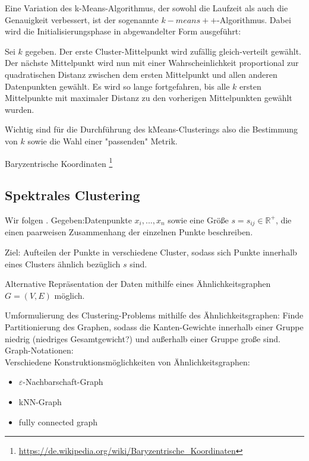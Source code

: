 \documentclass[11pt,a4paper]{article}
\numberwithin{equation}{section}
\begin{document}
	Eine Variation des k-Means-Algorithmus, der sowohl die Laufzeit als auch die Genauigkeit verbessert, ist der sogenannte $k-means++$-Algorithmus. Dabei wird die Initialisierungsphase in abgewandelter Form ausgeführt:
	
	Sei $k$ gegeben. Der erste Cluster-Mittelpunkt wird zufällig gleich-verteilt gewählt. Der nächste Mittelpunkt wird nun mit einer Wahrscheinlichkeit proportional zur quadratischen Distanz zwischen dem ersten Mittelpunkt und allen anderen Datenpunkten gewählt. Es wird so lange fortgefahren, bis alle $k$ ersten Mittelpunkte mit maximaler Distanz zu den vorherigen Mittelpunkten gewählt wurden.
	
	
	Wichtig sind für die Durchführung des kMeans-Clusterings also die Bestimmung von $k$ sowie die Wahl einer "passenden" Metrik.



	Baryzentrische Koordinaten \footnote{\url{https://de.wikipedia.org/wiki/Baryzentrische_Koordinaten}}
	
	\subsection{Spektrales Clustering}
	Wir folgen \cite{spectralClustering_tut}.
	Gegeben:Datenpunkte $x_i, ..., x_n$ sowie eine Größe $s = s_{ij} \in \mathbb{R}^{+}$, die einen paarweisen Zusammenhang der einzelnen Punkte beschreiben.
	
	Ziel: Aufteilen der Punkte in verschiedene Cluster, sodass sich Punkte innerhalb eines Clusters ähnlich bezüglich $s$ sind.
	
	Alternative Repräsentation der Daten mithilfe eines Ähnlichkeitsgraphen $G=(V,E)$ möglich.
	
	Umformulierung des Clustering-Problems mithilfe des Ähnlichkeitsgraphen: Finde Partitionierung des Graphen, sodass die Kanten-Gewichte innerhalb einer Gruppe niedrig (niedriges Gesamtgewicht?) und außerhalb einer Gruppe große sind.\\
	
	
	Graph-Notationen:\\
	
	Verschiedene Konstruktionsmöglichkeiten von Ähnlichkeitsgraphen:
	
	\begin{itemize}
		\item $\varepsilon$-Nachbarschaft-Graph\\
		\item kNN-Graph\\
		\item fully connected graph
	\end{itemize}
	
\end{document}
